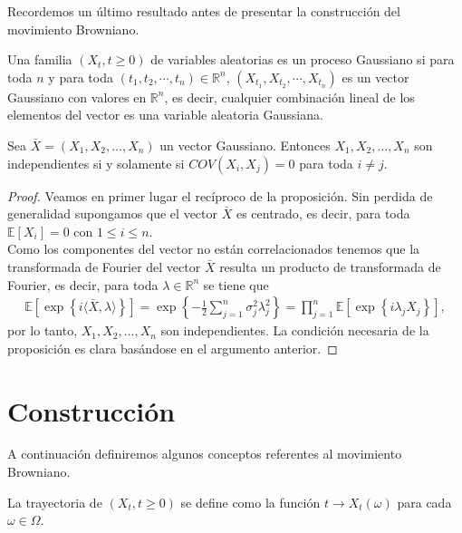 Recordemos un último resultado antes de presentar la construcción del movimiento Browniano.

\begin{definition}
Una familia $(X_t, t \geq 0)$ de variables aleatorias es un proceso Gaussiano si para toda $n$ y para toda $(t_1, t_2, \cdots, t_n) \in \mathbb{R}^n$, $(X_{t_1}, X_{t_2}, \cdots, X_{t_n})$ es un vector Gaussiano con valores en $\mathbb{R}^n$, es decir, cualquier combinación lineal de los elementos del vector es una variable aleatoria Gaussiana.
\end{definition}

\begin{proposition} \label{gaussiano1}
Sea $\bar{X} = (X_1, X_2, \ldots, X_n)$ un vector Gaussiano. Entonces $X_1, X_2, \ldots, X_n$ son independientes si y solamente si $COV(X_i, X_j) = 0$ para toda $i \neq j$.
\end{proposition}
\begin{proof}
Veamos en primer lugar el recíproco de la proposición. Sin perdida de generalidad supongamos que el vector $\bar{X}$ es centrado, es decir, para toda $\mathbb{E}[X_i] = 0$ con $1 \leq i \leq n$. \\

Como los componentes del vector no están correlacionados tenemos que la transformada de Fourier del vector $\bar{X}$ resulta un producto de transformada de Fourier, es decir, para toda $\lambda \in \mathbb{R}^n$ se tiene que
	\begin{align*}
	\mathbb{E} \left[ \exp \left\{ i \langle \bar{X}, \lambda \rangle \right\} \right] = \exp \left\{ - \frac{1}{2} \sum_{j = 1}^{n} \sigma_j^2 \lambda_j^2 \right\} = \prod_{j=1}^{n} \mathbb{E} \left[ \exp \left\{ i \lambda_j X_j \right\} \right],
	\end{align*}
por lo tanto, $X_1, X_2, \ldots, X_n$ son independientes. La condición necesaria de la proposición es clara basándose en el argumento anterior.
\end{proof}

\section{Construcción}
A continuación definiremos algunos conceptos referentes al movimiento Browniano.

\begin{definition}
La trayectoria de $(X_t, t \geq 0)$ se define como la función $t \rightarrow X_t(\omega)$ para cada $\omega \in \Omega$.
\end{definition}

